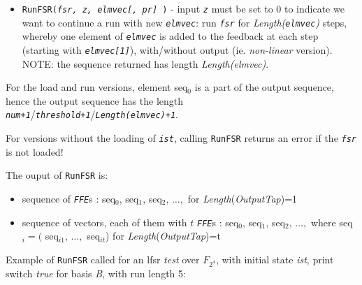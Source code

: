 \documentclass[a4paper,11pt]{report}
\begin{document}
{{{\begin{itemize}
\item  \texttt{RunFSR(\mbox{\texttt{\mdseries\slshape  fsr, z, elmvec[, pr] }})} - input \mbox{\texttt{\mdseries\slshape z}} must be set to 0 to indicate we want to continue a run with new \mbox{\texttt{\mdseries\slshape elmvec}}: run \mbox{\texttt{\mdseries\slshape fsr}} for \emph{Length(\mbox{\texttt{\mdseries\slshape elmvec}})} steps, whereby one element of \mbox{\texttt{\mdseries\slshape elmvec}} is added to the feedback at each step (starting with \mbox{\texttt{\mdseries\slshape elmvec[1]}}), with/without output (ie. \emph{non-linear} version). NOTE: the sequence returned has length \emph{Length(elmvec)}.
\end{itemize}
 For the load and run versions, element seq$_0$ is a part of the output sequence, hence the output sequence has the length \mbox{\texttt{\mdseries\slshape num+1}}/\mbox{\texttt{\mdseries\slshape threshold+1}}/\mbox{\texttt{\mdseries\slshape Length(elmvec)+1}}. 

 For versions without the loading of \mbox{\texttt{\mdseries\slshape ist}}, calling \texttt{RunFSR} returns an error if the \mbox{\texttt{\mdseries\slshape fsr}} is not loaded!

 The ouput of \texttt{RunFSR} is: 
\begin{itemize}
\item  sequence of \mbox{\texttt{\mdseries\slshape FFE}}s : seq$_0$, seq$_1$, seq$_2$, $\dots ,$ for \emph{Length}(\emph{OutputTap})=1
\item  sequence of vectors, each of them with $t$ \mbox{\texttt{\mdseries\slshape FFE}}s : seq$_0$, seq$_1$, seq$_2$, $\dots ,$ where seq$_i=($ seq$_{i1}$, $\dots , $ seq$_{it}$) for \emph{Length}(\emph{OutputTap})=t
\end{itemize}
 Example of \texttt{RunFSR} called for an lfsr \emph{test} over $F_{2^4}$, with initial state \emph{ist}, print switch \emph{true} for basis \emph{B}, with run length 5: 
\begin{Verbatim}[commandchars=!@|,fontsize=\small,frame=single,label=Example]
  

\end{Verbatim}}}}
\end{document}
